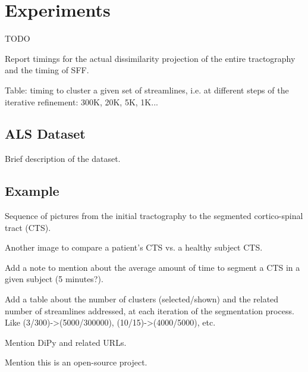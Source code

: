 \section{Experiments}
\label{sec:experiments}
TODO

Report timings for the actual dissimilarity projection of the entire
tractography and the timing of SFF.

Table: timing to cluster a given set of streamlines, i.e. at different
steps of the iterative refinement: 300K, 20K, 5K, 1K...

\subsection{ALS Dataset}
Brief description of the dataset.

\subsection{Example}
Sequence of pictures from the initial tractography to the segmented
cortico-spinal tract (CTS).

Another image to compare a patient's CTS vs. a healthy subject CTS.

Add a note to mention about the average amount of time to segment a
CTS in a given subject (5 minutes?).

Add a table about the number of clusters (selected/shown) and the
related number of streamlines addressed, at each iteration of the
segmentation process. Like (3/300)->(5000/300000),
(10/15)->(4000/5000), etc.

Mention DiPy and related URLs.

Mention this is an open-source project.



